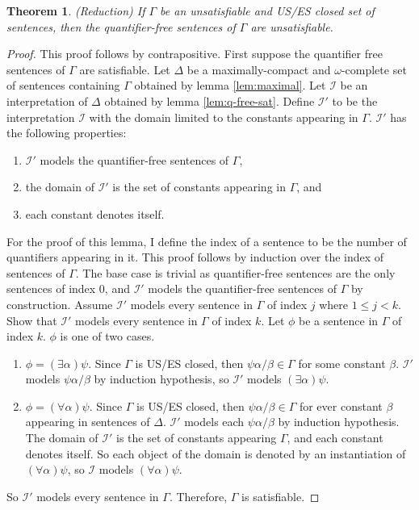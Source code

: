 \documentclass[12pt]{article}
\newtheorem{theorem}{Theorem}[section]
\theoremstyle{definition}
\theoremstyle{remark}
\begin{document}
\begin{theorem}{\textnormal{(Reduction)}}
	\label{reduction}
	If $\Gamma$ be an unsatisfiable and US/ES closed set of sentences, then the quantifier-free sentences of $\Gamma$ are unsatisfiable. 
\end{theorem}

\begin{proof}
	This proof follows by contrapositive. First suppose the quantifier free sentences of $\Gamma$ are satisfiable. Let $\Delta$ be a maximally-compact and $\omega$-complete set of sentences containing $\Gamma$ obtained by lemma \ref{lem:maximal}. Let $\mathscr{I}$ be an interpretation of $\Delta$ obtained by lemma \ref{lem:q-free-sat}. Define $\mathscr{I}'$ to be the interpretation $\mathscr{I}$ with the domain limited to the constants appearing in $\Gamma$. $\mathscr{I}'$ has the following properties:
	
	 \begin{enumerate}
	 	\item $\mathscr{I}'$ models the quantifier-free sentences of $\Gamma$,
	 	\item the domain of $\mathscr{I}'$ is the set of constants appearing in $\Gamma$, and
	 	\item each constant denotes itself.
	 \end{enumerate}
	
	For the proof of this lemma, I define the index of a sentence to be the number of quantifiers appearing in it. This proof follows by induction over the index of sentences of $\Gamma$. The base case is trivial as quantifier-free sentences are the only sentences of index 0, and $\mathscr{I}'$ models the quantifier-free sentences of $\Gamma$ by construction. Assume $\mathscr{I}'$ models every sentence in $\Gamma$ of index $j$ where $1 \leq j < k$. Show that $\mathscr{I}'$ models every sentence in $\Gamma$ of index $k$. Let $\phi$ be a sentence in $\Gamma$ of index $k$. $\phi$ is one of two cases.
	
	\begin{enumerate}
		\item $\phi=(\exists \alpha)\psi$. Since $\Gamma$ is US/ES closed, then $\psi\alpha/\beta \in \Gamma$ for some constant $\beta$. $\mathscr{I}'$ models $\psi\alpha/\beta$ by induction hypothesis, so $\mathscr{I}'$ models $(\exists \alpha)\psi$.
		\item $\phi=(\forall \alpha)\psi$. Since $\Gamma$ is US/ES closed, then $\psi\alpha/\beta \in \Gamma$ for ever constant $\beta$ appearing in sentences of $\Delta$. $\mathscr{I}'$ models each $\psi\alpha/\beta$ by induction hypothesis. The domain of $\mathscr{I}'$ is the set of constants appearing $\Gamma$, and each constant denotes itself. So each object of the domain is denoted by an instantiation of $(\forall \alpha)\psi$, so $\mathscr{I}$ models $(\forall \alpha)\psi$.
	\end{enumerate}

	So $\mathscr{I}'$ models every sentence in $\Gamma$. Therefore, $\Gamma$ is satisfiable.
\end{proof}
\end{document}
